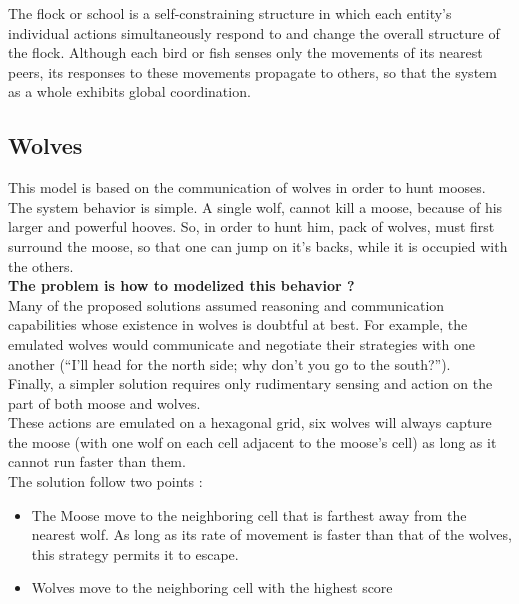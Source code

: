 The flock or school is a self-constraining structure in which each entity’s individual
actions simultaneously respond to and change the overall structure of the flock. Although each bird or fish senses only the movements of its nearest peers, its responses to these movements propagate to others, so that the system as a whole exhibits global coordination.

\subsection{Wolves}

This model is based on the communication of wolves in order to hunt mooses.\\
The system behavior is simple. A single wolf, cannot kill a moose, because of his larger and powerful hooves. So, in order to hunt him, pack of wolves, must first surround the moose, so that one can jump on it's backs, while it is occupied with the others.\\
\textbf{The problem is how to modelized this behavior ?}\\
Many of the proposed solutions assumed reasoning and communication capabilities whose existence in wolves is doubtful at best. For example, the emulated wolves would communicate and negotiate their strategies with one another (“I’ll head for the north side; why don’t you go to the south?”).\\
Finally, a simpler solution requires only rudimentary sensing and action on the part of both moose and wolves.\\
These actions are emulated on a hexagonal grid, six wolves will always capture the moose (with one wolf on each cell adjacent to the moose’s cell) as long as it cannot run faster than them.\\

The solution follow two points :
\begin{itemize}
\item The Moose move to the neighboring cell that is farthest away from the nearest wolf. As long as its rate of movement is faster than that of the wolves, this strategy permits it to escape.
\item Wolves move to the neighboring cell with the highest score
\end{itemize}

